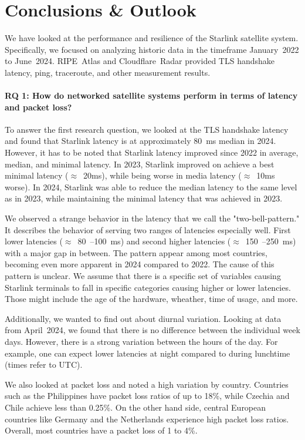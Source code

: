 \chapter{Conclusions \& Outlook} \label{sec:conclusion}

We have looked at the performance and resilience of the Starlink satellite
system. Specifically, we focused on analyzing historic data in the timeframe
January~2022 to June~2024. RIPE~Atlas and Cloudflare~Radar provided TLS
handshake latency, ping, traceroute, and other measurement results.

\subsubsection*{RQ 1: How do networked satellite systems perform in terms of latency
	and packet loss?}

To answer the first research question, we looked at the TLS handshake latency and found
that Starlink latency is at approximately 80~ms median in 2024. However, it has
to be noted that Starlink latency improved since 2022 in average, median, and
minimal latency. In 2023, Starlink improved on achieve a best minimal latency
($\approx$~20ms), while being worse in media latency ($\approx$~10ms worse). In
2024, Starlink was able to reduce the median latency to the same level as in
2023, while maintaining the minimal latency that was achieved in 2023.

We observed a strange behavior in the latency that we call the
"two-bell-pattern." It describes the behavior of serving two ranges
of latencies especially well. First lower latencies ($\approx$~80~--100~ms) and
second higher latencies ($\approx$~150~--250~ms) with a major gap in between.
The pattern appear among most countries, becoming even more apparent in 2024
compared to 2022. The cause of this pattern is unclear. We assume that there
is a specific set of variables causing Starlink terminals to fall in specific
categories causing higher or lower latencies. Those might include the age of
the hardware, wheather, time of usage, and more.

Additionally, we wanted to find out about diurnal variation. Looking at data
from April~2024, we found that there is no difference between the individual
week days. However, there is a strong variation between the hours of the day.
For example, one can expect lower latencies at night compared to during
lunchtime (times refer to UTC).

We also looked at packet loss and noted a high variation by country. Countries
such as the Philippines have packet loss ratios of up to 18\%, while Czechia
and Chile achieve less than 0.25\%. On the other hand side, central European
countries like Germany and the Netherlands experience high packet loss ratios.
Overall, most countries have a packet loss of 1 to 4\%.

